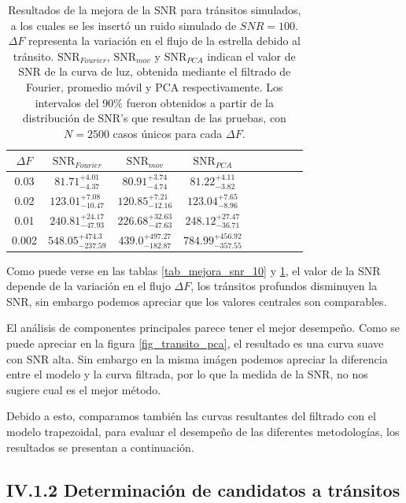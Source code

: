 \begin{table}[H]
	\centering
	\begin{tabular}{ccccccccc}
	\hline 
	$\Delta F$ & $\mbox{SNR}_{Fourier}$ &  $\mbox{SNR}_{mov}$ & $\mbox{SNR}_{PCA}$\\ 
	\hline
	0.03 & 	${81.71}_{-4.37}^{+4.01}$ & ${80.91}_{-4.74}^{+3.74}$ & ${81.22}_{-3.82}^{+4.11}$ \\
	0.02 &  ${123.01}_{-10.47}^{+7.08}$ & ${120.85}_{-12.16}^{+7.21}$ & ${123.04}_{-8.96}^{+7.65}$ \\
	0.01 & ${240.81}_{-47.93}^{+24.17}$ & ${226.68}_{-47.63}^{+32.63}$ & ${248.12}_{-36.71}^{+27.47}$ \\
	0.002 & ${548.05}_{-237.59}^{+474.3}$ & ${439.0}_{-182.87}^{+497.27}$ & ${784.99}_{-357.55}^{+456.92}$ \\
	\hline 
	\end{tabular} 
	\caption{Resultados de la mejora de la SNR para tránsitos simulados, a los cuales se les insertó un ruido simulado de $SNR=100$. $\Delta F$ representa la variación en el flujo de la estrella debido al tránsito. $\mbox{SNR}_{Fourier}$, $\mbox{SNR}_{mov}$ y $\mbox{SNR}_{PCA}$ indican el valor de SNR de la curva de luz, obtenida mediante el filtrado de Fourier, promedio móvil y PCA respectivamente. Los intervalos del 90\% fueron obtenidos a partir de la distribución de SNR's que resultan de las pruebas, con $N=2500$ casos únicos para cada $\Delta F$.}
	\label{tab_mejora_snr_100}
	\end{table}

Como puede verse en las tablas \ref{tab_mejora_snr_10} y \ref{tab_mejora_snr_100}, el valor de la SNR depende de la variación en el flujo $\Delta F$, los tránsitos profundos disminuyen la SNR, sin embargo podemos apreciar que los valores centrales son comparables.

El análisis de componentes principales parece tener el mejor desempeño. Como se puede apreciar en la figura \ref{fig_transito_pca}, el resultado es una curva suave con SNR alta. Sin embargo en la misma imágen podemos apreciar la diferencia entre el modelo y la curva filtrada, por lo que la medida de la SNR, no nos sugiere cual es el mejor método.

Debido a esto, comparamos también las curvas resultantes del filtrado con el modelo trapezoidal, para evaluar el desempeño de las diferentes metodologías, los resultados se presentan a continuación.

\subsection*{IV.1.2 Determinación de candidatos a tránsitos}

